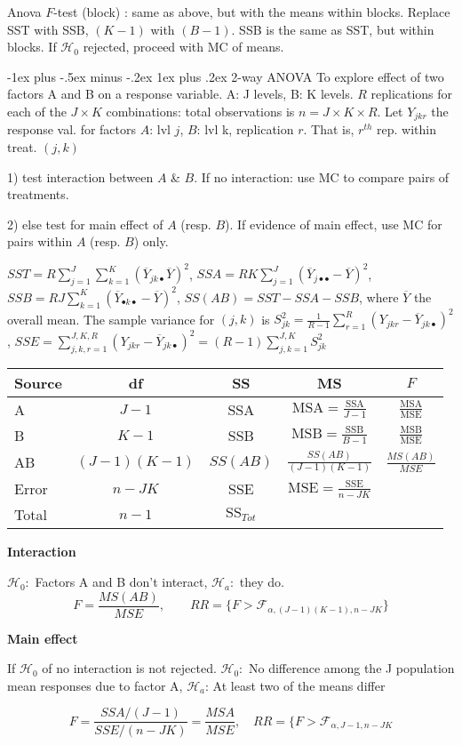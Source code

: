 \documentclass[8pt,landscape]{extarticle}
\makeatletter
\renewcommand{\subsubsection}{\@startsection{subsubsection}{3}{0mm}%
                                {-1ex plus -.5ex minus -.2ex}%
                                {1ex plus .2ex}%
                                {\normalfont\small\bfseries}}
\makeatother
\begin{document}
\begin{multicols}{3}
Anova $F$-test (block) : same as above, but with the means within blocks. Replace SST with SSB, $(K-1)$ with $(B-1)$. SSB is the same as SST, but within blocks. If $\mathcal{H}_0$ rejected, proceed with MC of means. 

\subsubsection{2-way ANOVA}
To explore effect of two factors A and B on a response variable. A: J levels, B: K levels. $R$ replications for each of the $J \times K$ combinations: total observations is $n = J \times K \times R$. Let $Y_{jkr}$ the response val. for factors $A$: lvl $j$, $B$: lvl k, replication $r$. That is, $r^{th}$ rep. within treat. $(j,k)$

1) test interaction between $A$ \& $B$. If no interaction: use MC to compare pairs of treatments.

2) else test for main effect of $A$ (resp. $B$). If evidence of main effect, use MC for pairs within $A$ (resp. $B$) only.

$SST = R \sum_{j=1}^J \sum_{k=1}^K (\overline{Y}_{jk \bullet} \overline{Y})^2$,
$SSA = RK \sum_{j=1}^J (\overline{Y}_{j\bullet \bullet} -\overline{Y})^2$,
$SSB = RJ \sum_{k=1}^K (\overline{Y}_{\bullet k \bullet} -\overline{Y})^2$, $SS(AB) = SST-SSA-SSB$, where $\overline{Y}$ the overall mean. The sample variance for $(j,k)$ is $S_{jk}^2 = \frac{1}{ R-1} \sum_{r=1}^R (Y_{jkr} -\overline{Y}_{jk\bullet} )^2$, $SSE = \sum_{j,k,r =1}^{J,K,R} (Y_{jkr} - \overline{Y}_{jk \bullet} )^2 =(R-1) \sum^{J,K}_{j,k=1} S_{jk}^2$

\begin{tabular}{lcccc}
Source & df & SS & MS & $F$ \\
\hline
A & $J-1$ & SSA & $\mathrm{MSA}=\frac{\mathrm{SSA}}{J-1}$ & $\frac{\mathrm{MSA}}{\mathrm{MSE}}$ \\
B & $K-1$ & SSB & $\mathrm{MSB}=\frac{\mathrm{SSB}}{B-1}$ & $\frac{\mathrm{MSB}}{\mathrm{MSE}}$ \\
AB & $(J-1)(K-1)$ & $SS(AB)$ & $\frac{SS(AB)}{(J-1)(K-1)}$ & $\frac{MS(AB)}{MSE}$ \\
Error & $n-JK$ & SSE & $\mathrm{MSE}=\frac{\mathrm{SSE}}{n-JK}$& \\
\hline
Total& $n-1$ & $\mathrm{SS}_{Tot}$

\end{tabular}

\textbf{Interaction}

$\mathcal{H}_0 :$ Factors A and B don't interact, $\mathcal{H}_a :$ they do.
$$F = \frac{MS(AB)}{ MSE}, \quad \quad RR = \{ F > \mathcal{F}_{\alpha, (J-1)(K-1), n-JK} \} $$

\textbf{Main effect}

If $\mathcal{H}_0$ of no interaction is not rejected. $\mathcal{H}_0 :$ No difference among the J population mean responses due to factor A, 
$\mathcal{H}_a$: At least two of the means differ

$$F = \frac{SSA/(J-1) }{SSE/(n-JK)} = \frac{MSA}{MSE}, \quad RR = \{ F > \mathcal{F}_{\alpha ,J-1, n-JK} $$


\end{multicols}
\end{document}
